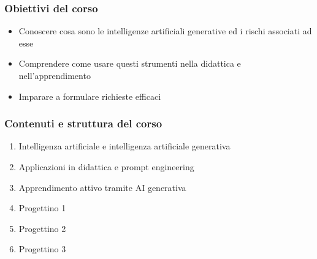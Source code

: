 

\begin{contentframe}
    \frametitle{Obiettivi del corso}

    \begin{itemize}
        \item Conoscere cosa sono le intelligenze artificiali generative ed i rischi associati ad esse
        
        \bigskip
        \item Comprendere come usare questi strumenti nella didattica e nell'apprendimento

        \bigskip
        \item Imparare a formulare richieste efficaci
    \end{itemize}
\end{contentframe}

\begin{contentframe}
    \frametitle{Contenuti e struttura del corso}

    \begin{enumerate}
        \item Intelligenza artificiale e intelligenza artificiale generativa
        \item Applicazioni in didattica e prompt engineering
        \bigskip
        \item Apprendimento attivo tramite AI generativa
        \item Progettino 1
        \item Progettino 2
        \item Progettino 3
    \end{enumerate}
\end{contentframe}



